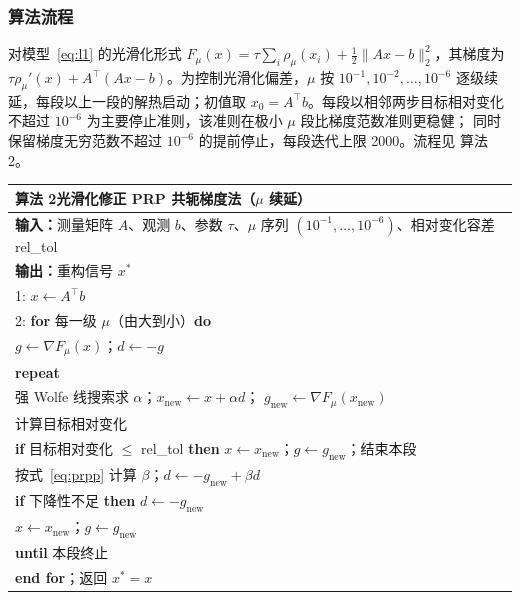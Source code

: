 \documentclass[withoutpreface,bwprint]{cumcmthesis}
\newenvironment{algtable}[1]{%
  \par\medskip\noindent
  \begin{minipage}{\textwidth}\scriptsize
  \begin{tabular}{p{\dimexpr\textwidth-2\tabcolsep}}
    \toprule
    \textbf{#1} \\
    \midrule
}{%
    \\ \bottomrule
  \end{tabular}
  \end{minipage}
  \par\medskip
}
\begin{document}
\subsubsection{算法流程}

对模型~\eqref{eq:l1} 的光滑化形式
$F_{\mu}(x)=\tau\sum_i\rho_{\mu}(x_i)+\frac12\|Ax-b\|_2^{2}$，其梯度为
$\tau\rho_{\mu}'(x)+A^{\top}(Ax-b)$。为控制光滑化偏差，$\mu$ 按
$10^{-1},10^{-2},\dots,10^{-6}$ 逐级续延，每段以上一段的解热启动；初值取
$x_0=A^{\top}b$。每段以相邻两步目标相对变化不超过 $10^{-6}$
为主要停止准则，该准则在极小 $\mu$ 段比梯度范数准则更稳健；
同时保留梯度无穷范数不超过 $10^{-6}$ 的提前停止，每段迭代上限 2000。流程见
算法 2。

\begin{algtable}{算法 2\quad 光滑化修正 PRP 共轭梯度法（$\mu$ 续延）}
\textbf{输入：}测量矩阵 $A$、观测 $b$、参数 $\tau$、$\mu$ 序列
$(10^{-1},\dots,10^{-6})$、相对变化容差 rel\_tol \\
\textbf{输出：}重构信号 $x^{*}$ \\
1: $x\leftarrow A^{\top}b$ \\
2: \textbf{for} 每一级 $\mu$（由大到小）\textbf{do} \\
\hspace{1.5em} $g\leftarrow\nabla F_{\mu}(x)$；$d\leftarrow-g$ \\
\hspace{1.5em} \textbf{repeat} \\
\hspace{3em} 强 Wolfe 线搜索求 $\alpha$；$x_{\mathrm{new}}\leftarrow x+\alpha d$；
$g_{\mathrm{new}}\leftarrow\nabla F_{\mu}(x_{\mathrm{new}})$ \\
\hspace{3em} 计算目标相对变化 \\
\hspace{3em} \textbf{if} 目标相对变化 $\le$ rel\_tol \textbf{then}
$x\leftarrow x_{\mathrm{new}}$；$g\leftarrow g_{\mathrm{new}}$；结束本段 \\
\hspace{3em} 按式~\eqref{eq:prpp} 计算 $\beta$；$d\leftarrow-g_{\mathrm{new}}+\beta d$ \\
\hspace{3em} \textbf{if} 下降性不足 \textbf{then} $d\leftarrow-g_{\mathrm{new}}$ \\
\hspace{3em} $x\leftarrow x_{\mathrm{new}}$；$g\leftarrow g_{\mathrm{new}}$ \\
\hspace{1.5em} \textbf{until} 本段终止 \\
\textbf{end for}；返回 $x^{*}=x$
\end{algtable}
\end{document}

